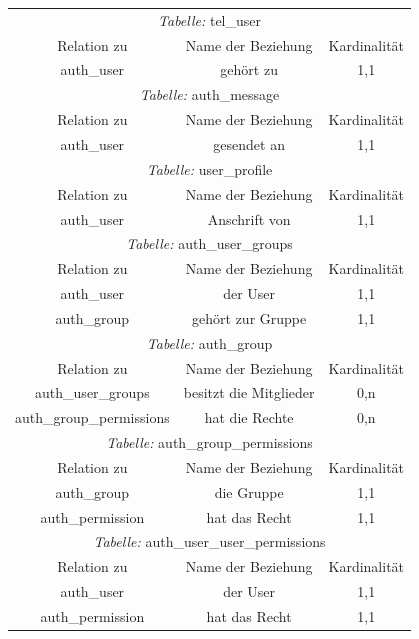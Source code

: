 \begin{longtable}{@{}ccc@{}}
  \toprule
  \multicolumn{3}{c}{\emph{Tabelle:} tel\_user} \\
  Relation zu & Name der Beziehung & Kardinalität \\
  \cmidrule(lr){1-1}\cmidrule(lr){2-2}\cmidrule(lr){3-3}
  auth\_user & gehört zu & 1,1 \\

  \toprule
  \multicolumn{3}{c}{\emph{Tabelle:} auth\_message} \\
  Relation zu & Name der Beziehung & Kardinalität \\
  \cmidrule(lr){1-1}\cmidrule(lr){2-2}\cmidrule(lr){3-3}
  auth\_user & gesendet an & 1,1 \\

  \toprule
  \multicolumn{3}{c}{\emph{Tabelle:} user\_profile} \\
  Relation zu & Name der Beziehung & Kardinalität \\
  \cmidrule(lr){1-1}\cmidrule(lr){2-2}\cmidrule(lr){3-3}
  auth\_user & Anschrift von & 1,1 \\

  \toprule
  \multicolumn{3}{c}{\emph{Tabelle:} auth\_user\_groups} \\
  Relation zu & Name der Beziehung & Kardinalität \\
  \cmidrule(lr){1-1}\cmidrule(lr){2-2}\cmidrule(lr){3-3}
  auth\_user & der User & 1,1 \\
  auth\_group & gehört zur Gruppe & 1,1 \\

  \toprule
  \multicolumn{3}{c}{\emph{Tabelle:} auth\_group} \\
  Relation zu & Name der Beziehung & Kardinalität \\
  \cmidrule(lr){1-1}\cmidrule(lr){2-2}\cmidrule(lr){3-3}
  auth\_user\_groups & besitzt die Mitglieder & 0,n \\
  auth\_group\_permissions & hat die Rechte & 0,n \\

  \toprule
  \multicolumn{3}{c}{\emph{Tabelle:} auth\_group\_permissions} \\
  Relation zu & Name der Beziehung & Kardinalität \\
  \cmidrule(lr){1-1}\cmidrule(lr){2-2}\cmidrule(lr){3-3}
  auth\_group & die Gruppe & 1,1 \\
  auth\_permission & hat das Recht & 1,1 \\

  \toprule
  \multicolumn{3}{c}{\emph{Tabelle:} auth\_user\_user\_permissions} \\
  Relation zu & Name der Beziehung & Kardinalität \\
  \cmidrule(lr){1-1}\cmidrule(lr){2-2}\cmidrule(lr){3-3}
  auth\_user & der User & 1,1 \\
  auth\_permission & hat das Recht & 1,1 \\


\end{longtable}
